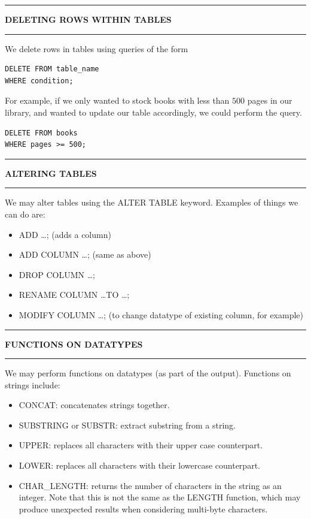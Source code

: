 \documentclass[8pt]{extarticle}
\newcommand{\heading}[1]{%
    \noindent
    \rule{\linewidth}{0.4pt}
    \begin{center}
        \vspace{-1ex}
        \textbf{#1}        
        \vspace{-2.5ex}
    \end{center}
    \rule{\linewidth}{0.4pt}
}
\begin{document}
\begin{multicols}{4}
\setlength{\columnseprule}{1pt} %
\heading{DELETING ROWS WITHIN TABLES}

We delete rows in tables using queries of the form 

\vspace{0.5ex}
\begin{lstlisting}[style=sql]
DELETE FROM table_name 
WHERE condition;
\end{lstlisting}
\vspace{0.5ex}

For example, if we only wanted to stock books with less than $500$ pages in our library, and wanted to update our table accordingly, we could perform the query.

\vspace{0.5ex}
\begin{lstlisting}[style=sql]
DELETE FROM books
WHERE pages >= 500;
\end{lstlisting}
\vspace{0.5ex}


\heading{ALTERING TABLES}

We may alter tables using the ALTER TABLE keyword. Examples of things we can do are:

\begin{itemize}
    \item ADD \ldots; (adds a column)
    \item ADD COLUMN \ldots; (same as above)
    \item DROP COLUMN \ldots;
    \item RENAME COLUMN \ldots TO \ldots;
    \item MODIFY COLUMN \ldots; (to change datatype of existing column, for example)
\end{itemize}

\vspace{1ex} 
\heading{FUNCTIONS ON DATATYPES}

We may perform functions on datatypes (as part of the output). Functions on strings include:
\begin{itemize}[leftmargin=*]
    \item CONCAT: concatenates strings together.
    \item SUBSTRING or SUBSTR: extract substring from a string.
    \item UPPER: replaces all characters with their upper case counterpart.
    \item LOWER: replaces all characters with their lowercase counterpart.
    \item CHAR\_LENGTH: returns the number of characters in the string as an integer. Note that this is not the same as the LENGTH function, which may produce unexpected results when considering multi-byte characters.
\end{itemize}


\end{multicols}
\end{document}
